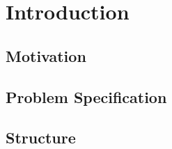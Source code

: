 \chapter{Introduction}
\label{ch:introduction}

\section{Motivation}

\section{Problem Specification}

\section{Structure}
